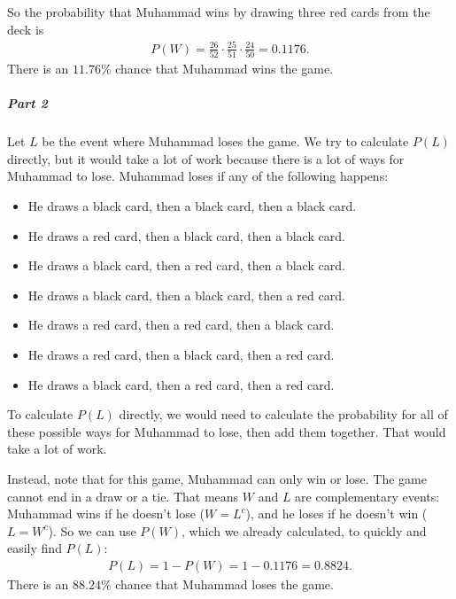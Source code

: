 \documentclass[letterpaper,10pt,english]{jupyterBook}
\begin{document}
\sphinxAtStartPar
So the probability that Muhammad wins by drawing three red cards from the deck is
\begin{equation*}
\begin{split} P(W) = \frac{26}{52} \cdot \frac{25}{51} \cdot \frac{24}{50} = 0.1176. \end{split}
\end{equation*}
\sphinxAtStartPar
There is an \(11.76\%\) chance that Muhammad wins the game.


\subparagraph{Part 2}
\label{\detokenize{Ch3 Probability/3.4 Addition Rules and Mutually Exclusive Events:id17}}
\sphinxAtStartPar
Let \(L\) be the event where Muhammad loses the game. We  try to calculate \(P(L)\) directly, but it would take a lot of work because there is a lot of ways for Muhammad to lose. Muhammad loses if any of the following happens:
\begin{itemize}
\item {} 
\sphinxAtStartPar
He draws a black card, then a black card, then a black card.

\item {} 
\sphinxAtStartPar
He draws a red card, then a black card, then a black card.

\item {} 
\sphinxAtStartPar
He draws a black card, then a red card, then a black card.

\item {} 
\sphinxAtStartPar
He draws a black card, then a black card, then a red card.

\item {} 
\sphinxAtStartPar
He draws a red card, then a red card, then a black card.

\item {} 
\sphinxAtStartPar
He draws a red card, then a black card, then a red card.

\item {} 
\sphinxAtStartPar
He draws a black card, then a red card, then a red card.

\end{itemize}

\sphinxAtStartPar
To calculate \(P(L)\) directly, we would need to calculate the probability for all of these possible ways for Muhammad to lose, then add them together. That would take a lot of work.

\sphinxAtStartPar
Instead, note that for this game, Muhammad can only win or lose. The game cannot end in a draw or a tie. That means \(W\) and \(L\) are complementary events: Muhammad wins if he doesn’t lose (\(W = L^c\)), and he loses if he doesn’t win (\(L = W^c\)). So we can use \(P(W)\), which we already calculated, to quickly and easily find \(P(L)\):
\begin{equation*}
\begin{split} P(L) = 1 - P(W) = 1 - 0.1176 = 0.8824. \end{split}
\end{equation*}
\sphinxAtStartPar
There is an \(88.24\%\) chance that Muhammad loses the game.
\end{document}
